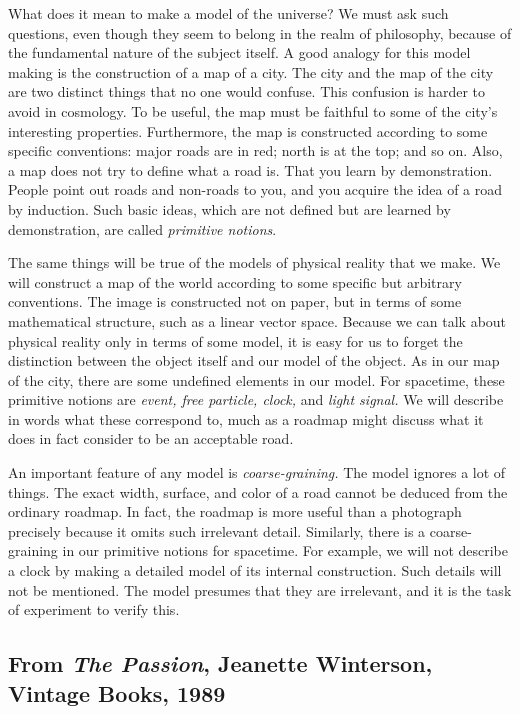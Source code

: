 \documentclass[
]{memoir}
\begin{document}
What does it mean to make a model of the universe? We must ask such
questions, even though they seem to belong in the realm of philosophy,
because of the fundamental nature of the subject itself. A good analogy
for this model making is the construction of a map of a city. The city
and the map of the city are two distinct things that no one would
confuse. This confusion is harder to avoid in cosmology. To be useful,
the map must be faithful to some of the city's interesting properties.
Furthermore, the map is constructed according to some specific
conventions: major roads are in red; north is at the top; and so on.
Also, a map does not try to define what a road is. That you learn by
demonstration. People point out roads and non-roads to you, and you
acquire the idea of a road by induction. Such basic ideas, which are not
defined but are learned by demonstration, are called \emph{primitive
notions}.

The same things will be true of the models of physical reality that we
make. We will construct a map of the world according to some specific
but arbitrary conventions. The image is constructed not on paper, but in
terms of some mathematical structure, such as a linear vector space.
Because we can talk about physical reality only in terms of some model,
it is easy for us to forget the distinction between the object itself
and our model of the object. As in our map of the city, there are some
undefined elements in our model. For spacetime, these primitive notions
are \emph{event, free particle, clock,} and \emph{light signal.} We will
describe in words what these correspond to, much as a roadmap might
discuss what it does in fact consider to be an acceptable road.

An important feature of any model is \emph{coarse-graining.} The model
ignores a lot of things. The exact width, surface, and color of a road
cannot be deduced from the ordinary roadmap. In fact, the roadmap is
more useful than a photograph precisely because it omits such irrelevant
detail. Similarly, there is a coarse-graining in our primitive notions
for spacetime. For example, we will not describe a clock by making a
detailed model of its internal construction. Such details will not be
mentioned. The model presumes that they are irrelevant, and it is the
task of experiment to verify this.

\hypertarget{from-the-passion-jeanette-winterson-vintage-books-1989}{%
\subsection*{\texorpdfstring{From \emph{The Passion}, Jeanette
Winterson, Vintage Books,
1989}{From The Passion, Jeanette Winterson, Vintage Books, 1989}}\label{from-the-passion-jeanette-winterson-vintage-books-1989}}
\end{document}
